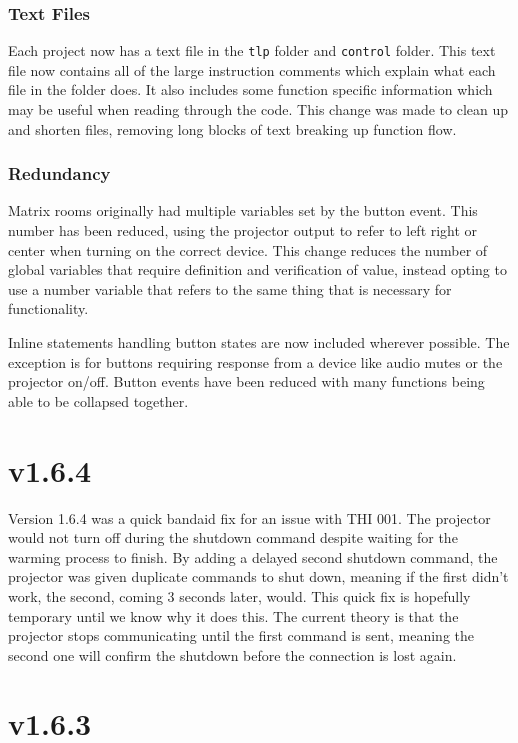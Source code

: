 \documentclass{article}
\begin{document}
\subsubsection*{Text Files}

Each project now has a text file in the \lstinline|tlp| folder and \lstinline|control| folder. This text file now contains 
all of the large instruction comments which explain what each file in the folder does. It also includes some function 
specific information which may be useful when reading through the code. This change was made to clean up and shorten files,
removing long blocks of text breaking up function flow. 

\subsubsection*{Redundancy}

Matrix rooms originally had multiple variables set by the button event. This number has been reduced, using the projector 
output to refer to left right or center when turning on the correct device. This change reduces the number of global variables 
that require definition and verification of value, instead opting to use a number variable that refers to the same thing that 
is necessary for functionality.

Inline statements handling button states are now included wherever possible. The exception is for buttons requiring response 
from a device like audio mutes or the projector on/off. Button events have been reduced with many functions being able to
be collapsed together. 

\section*{v1.6.4}

Version 1.6.4 was a quick bandaid fix for an issue with THI 001. The projector would not turn off during the shutdown command
despite waiting for the warming process to finish. By adding a delayed second shutdown command, the projector was given 
duplicate commands to shut down, meaning if the first didn't work, the second, coming 3 seconds later, would. This quick fix 
is hopefully temporary until we know why it does this. The current theory is that the projector stops communicating until the 
first command is sent, meaning the second one will confirm the shutdown before the connection is lost again. 

\section*{v1.6.3}
\end{document}
